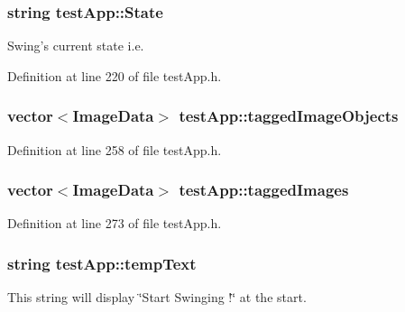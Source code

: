 \hypertarget{classtest_app_a8ce5505df4526abed238956b65956edd}{
\subsubsection[{State}]{\setlength{\rightskip}{0pt plus 5cm}string test\-App\-::\-State}}\label{classtest_app_a8ce5505df4526abed238956b65956edd}


Swing's current state i.\-e. 



Definition at line 220 of file test\-App.\-h.

\hypertarget{classtest_app_af65c8dc2f4620bfe7fdf6a39043cb48d}{
\subsubsection[{tagged\-Image\-Objects}]{\setlength{\rightskip}{0pt plus 5cm}vector$<${\bf Image\-Data}$>$ test\-App\-::tagged\-Image\-Objects}}\label{classtest_app_af65c8dc2f4620bfe7fdf6a39043cb48d}


Definition at line 258 of file test\-App.\-h.

\hypertarget{classtest_app_a7f7226fc54fdb7d06366ed0fa3ab7ee3}{
\subsubsection[{tagged\-Images}]{\setlength{\rightskip}{0pt plus 5cm}vector$<${\bf Image\-Data}$>$ test\-App\-::tagged\-Images}}\label{classtest_app_a7f7226fc54fdb7d06366ed0fa3ab7ee3}


Definition at line 273 of file test\-App.\-h.

\hypertarget{classtest_app_ad9a4beab6f2e0f13d32b00b502e89bdc}{
\subsubsection[{temp\-Text}]{\setlength{\rightskip}{0pt plus 5cm}string test\-App\-::temp\-Text}}\label{classtest_app_ad9a4beab6f2e0f13d32b00b502e89bdc}


This string will display \char`\"{}\-Start Swinging !\char`\"{} at the start. 



